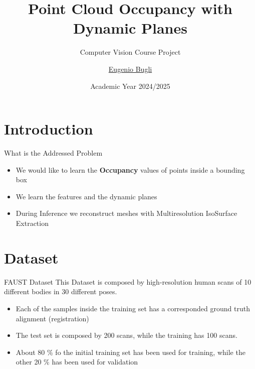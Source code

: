 \documentclass{beamer}
\title{Point Cloud Occupancy with Dynamic Planes}
\subtitle{Computer Vision Course Project}
\author{\href{mailto:bugli.1934824@studenti.uniroma1.it}{Eugenio Bugli}}
\date{Academic Year 2024/2025}
\begin{document}
\maketitle

\section{Introduction}

\begin{frame}{What is the Addressed Problem}
\begin{itemize}
	  \item We would like to learn the \textbf{Occupancy} values of points inside a bounding box
	  \item We learn the features and the dynamic planes 
	  \item During Inference we reconstruct meshes with Multiresolution IsoSurface Extraction
\end{itemize}
\end{frame} 

\section{Dataset}

\begin{frame}{FAUST Dataset}
    This Dataset is composed by high-resolution human scans of 10 different bodies in 30 different poses. 
    \begin{itemize}
    \item Each of the samples inside the training set has a corresponded ground truth alignment (registration)
    \item The test set is composed by 200 scans, while the training has 100 scans.
    \item About 80 \% fo the initial training set has been used for training, while the other 20 \% has been used for validation 
    \end{itemize}
\end{frame}


\end{document}

